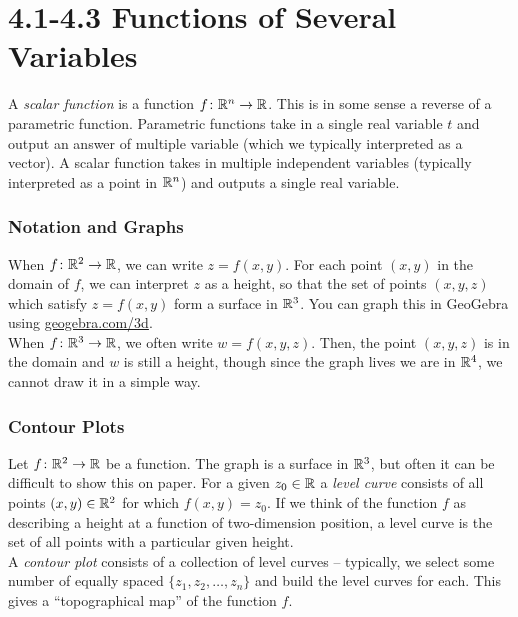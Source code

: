 \section*{4.1-4.3 Functions of Several Variables}
\setcounter{section}{1}
A \textit{scalar function} is a function \(f \colon \mathbb{R}^{n} \to \mathbb{R}\). This is in some sense a reverse of a parametric function. Parametric functions take in a single real variable \(t\) and output an answer of multiple variable (which we typically interpreted as a vector). A scalar function takes in multiple independent variables (typically interpreted as a point in \(\mathbb{R}^{n}\)) and outputs a single real variable.

\subsubsection{Notation and Graphs}

When \(f \colon \mathbb{R}^{2} \to \mathbb{R}\), we can write \(z = f(x, y)\). For each point \((x, y)\) in the domain of \(f\), we can interpret \(z\) as a height, so that the set of points \((x, y, z)\) which satisfy \(z = f(x, y)\) form a surface in \(\mathbb{R}^{3}\). You can graph this in GeoGebra using \url{geogebra.com/3d}. \\

When \(f \colon \mathbb{R}^{3} \to \mathbb{R}\), we often write \(w = f(x, y, z)\). Then, the point \((x, y, z)\) is in the domain and \(w\) is still a height, though since the graph lives we are in \(\mathbb{R}^{4}\), we cannot draw it in a simple way.

\subsubsection{Contour Plots}

Let \(f \colon \mathbb{R}^{2} \to \mathbb{R}\) be a function. The graph is a surface in \(\mathbb{R}^{3}\), but often it can be difficult to show this on paper. For a given \(z_{0} \in \mathbb{R}\) a \textit{level curve} consists of all points \((x, y) \in \mathbb{R}^{2}\) for which \(f(x, y) = z_{0}\). If we think of the function \(f\) as describing a height at a function of two-dimension position, a level curve is the set of all points with a particular given height. \\

A \textit{contour plot} consists of a collection of level curves – typically, we select some number of equally spaced \(\{z_{1}, z_{2}, \ldots, z_{n}\}\) and build the level curves for each. This gives a “topographical map” of the function \(f\).

